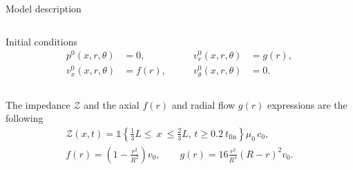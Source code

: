\documentclass[aspectratio=169]{ISAE-Beamer}
\begin{document}
\begin{frame}{Model description}
\begin{overlayarea}{\textwidth}{\textheight}
{\begin{columns}[T]
			\begin{column}{.45\textwidth}
				Initial conditions
				\begin{equation*}
				\begin{aligned}
				p^0(x, r, \theta) &= 0, \\
				v_x^0(x, r, \theta) &= f(r), 
				\end{aligned}  \qquad
				\begin{aligned}
				v_r^0(x, r, \theta) &= g(r), \\
				v_\theta^0(x, r, \theta) &= 0.
				\end{aligned}    
				\end{equation*}
			\end{column}
		\end{columns}
		\vspace{5pt}
		The impedance $\mathcal{Z}$ and the axial $f(r)$ and radial flow $g(r)$ expressions are the following
		\begin{equation*}
		\begin{aligned}
		\mathcal{Z}(x, t) = \mathds{1}\left\{ \frac{1}{3} L \leq \ x \ \leq \frac{2}{3} L, \,  t \geq 0.2 \ t_{\text{fin}} \right\} \mu_0 \, c_0, \\
		f(r) = \left( 1 - \frac{r^2}{R^2} \right) v_0, \qquad
		g(r) = 16 \frac{r^2}{R^4} \left( R - r \right)^2 v_0. 
		\end{aligned}
		\end{equation*}
	}
\end{overlayarea}
\end{frame}
\end{document}
